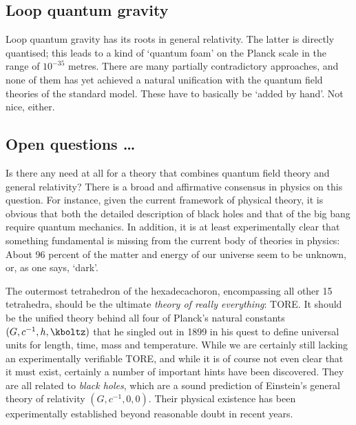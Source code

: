 \documentclass{scrartcl}
\begin{document}
\subsection*{Loop quantum gravity}

Loop quantum gravity has its roots in general relativity. The latter is directly quantised; this leads to a kind of \enquote*{quantum foam} on the Planck scale in the range of $10^{-35}$ metres. There are many partially contradictory approaches, and none of them has yet achieved a natural unification with the quantum field theories of the standard model. These have to basically be \enquote*{added by hand}. Not nice, either.


\subsection*{Open questions \dots}

Is there any need at all for a theory that combines quantum field theory and general relativity? There is a broad and affirmative consensus in physics on this question. For instance, given the current framework of physical theory, it is obvious that both the detailed description of black holes and that of the big bang require quantum mechanics. In addition, it is at least experimentally clear that something fundamental is missing from the current body of theories in physics: About 96 percent of the matter and energy of our universe seem to be unknown, or, as one says, \enquote*{dark}.


\newpage {}
\label{sec:1111}

The outermost tetrahedron of the hexadecachoron, encompassing all other 15 tetrahedra, should be the ultimate \emph{theory of really everything}: TORE. It should be the unified theory behind all four of Planck's natural constants $(G,c^{-1},h,\kboltz)$ that he singled out in 1899 in his quest to define universal units for length, time, mass and temperature. While we are certainly still lacking an experimentally verifiable TORE, and while it is of course not even clear that it must exist, certainly a number of important hints have been discovered. They are all related to \emph{black holes}, which are a sound prediction of Einstein's general theory of relativity $(G,c^{-1},0,0)$. Their physical existence has been experimentally established beyond reasonable doubt in recent years.
\end{document}
